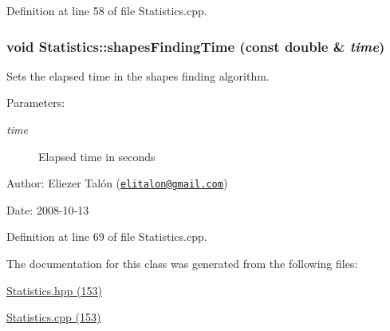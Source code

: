 Definition at line 58 of file Statistics.cpp.\hypertarget{class_statistics_bc0a0e96adba6828ffb915a617b58ed2}{
\subsubsection[shapesFindingTime]{\setlength{\rightskip}{0pt plus 5cm}void Statistics::shapesFindingTime (const double \& {\em time})}}
\label{class_statistics_bc0a0e96adba6828ffb915a617b58ed2}


Sets the elapsed time in the shapes finding algorithm. 

\begin{Desc}
\item[Parameters:]
\begin{description}
\item[{\em time}]Elapsed time in seconds\end{description}
\end{Desc}
\begin{Desc}
\item[Author:]Eliezer Talón (\href{mailto:elitalon@gmail.com}{\tt elitalon@gmail.com}) \end{Desc}
\begin{Desc}
\item[Date:]2008-10-13 \end{Desc}


Definition at line 69 of file Statistics.cpp.

The documentation for this class was generated from the following files:\begin{CompactItemize}
\item 
\hyperlink{_statistics_8hpp}{Statistics.hpp (153)}\item 
\hyperlink{_statistics_8cpp}{Statistics.cpp (153)}\end{CompactItemize}
